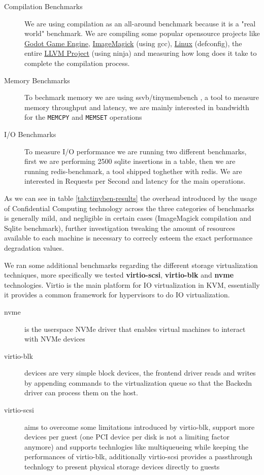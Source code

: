 \documentclass[twocolumn]{article}
\begin{document}
\begin{description}
    \item[Compilation Benchmarks] We are using compilation as an all-around benchmark because it is a "real world" benchmark. We are compiling some popular opensource projects like \href{https://github.com/godotengine/godot}{Godot Game Engine}, \href{https://github.com/imagemagick/imagemagick}{ImageMagick} (using gcc), \href{https://git.kernel.org/pub/scm/linux/kernel/git/torvalds/linux.git}{Linux} (defconfig), the entire \href{https://github.com/llvm/llvm-project}{LLVM Project} (using ninja) and measuring how long does it take to complete the compilation process.
    \item[Memory Benchmarks] To bechmark memory we are using ssvb/tinymembench \cite{tinymembench}, a tool to measure memory throughput and latency, we are mainly interested in bandwidth for the \texttt{MEMCPY} and \texttt{MEMSET} operations
    \item[I/O Benchmarks] To measure I/O performance we are running two different benchmarks, first we are performing 2500 sqlite insertions in a table, then we are running redis-benchmark, a tool shipped toghether with redis. We are interested in Requests per Second and latency for the main operations. 
\end{description}

As we can see in table \ref{tab:tinyben-results} the overhead introduced by the usage of Confidential Computing technology across the three categories of benchmarks is generally mild, and negligible in certain cases (ImageMagick compilation and Sqlite benchmark), further investigation tweaking the amount of resources available to each machine is necessary to correcly esteem the exact performance degradation values.

We ran some additional benchmarks regarding the different storage virtualization techniques, more specifically we tested \textbf{virtio-scsi}, 
\textbf{virtio-blk} and \textbf{nvme} technologies. Virtio is the main platform for IO virtualization in KVM, essentially it provides a common framework for hypervisors to do IO virtualization.

\begin{description}
    \item[nvme] is the userspace NVMe driver that enables virtual machines to interact with NVMe devices
    \item[virtio-blk] devices are very simple block devices, the frontend driver reads and writes by appending commands to the virtualization queue so that the Backedn driver can process them on the host.
    \item[virtio-scsi] aims to overcome some limitations introduced by virtio-blk, support more devices per guest (one PCI device per disk is not a limiting factor anymore) and supports technlogies like multiqueueing while keeping the performances of virtio-blk, additionally virtio-scsi provides a passthrough technlogy to present physical storage devices directly to guests
\end{description}
\end{document}
